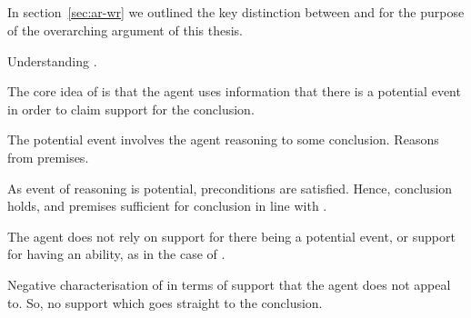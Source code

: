 \subsection{\WR{}}
\label{sec:wr}

\begin{note}[Overview]
  In section~\ref{sec:ar-wr} we outlined the key distinction between \AR{} and \WR{} for the purpose of the overarching argument of this thesis.

  Understanding \WR{}.
\end{note}

\begin{note}
  The core idea of \WR{} is that the agent uses information that there is a potential event in order to claim support for the conclusion.

  The potential event involves the agent reasoning to some conclusion.
  Reasons from premises.

  As event of reasoning is potential, preconditions are satisfied.
  Hence, conclusion holds, and premises sufficient for conclusion in line with \bP{}.


  The agent does not rely on support for there being a potential event, or support for having an ability, as in the case of \AR{}.
\end{note}

\begin{note}
  Negative characterisation of \WR{} in terms of support that the agent does not appeal to.
  So, no support which goes straight to the conclusion.
\end{note}



